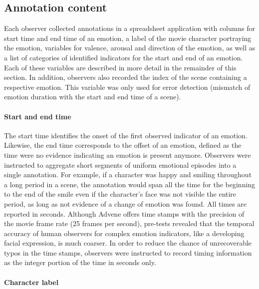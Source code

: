 \subsection*{Annotation content}

Each observer collected annotations in a spreadsheet application with columns
for start time and end time of an emotion, a label of the movie character
portraying the emotion, variables for valence, arousal and direction of the
emotion, as well as a list of categories of identified indicators for the start
and end of an emotion. Each of these variables are described in more detail in
the remainder of this section. In addition, observers also recorded the index
of the scene containing a respective emotion. This variable was only used for
error detection (mismatch of emotion duration with the start and end time of a
scene).

\paragraph{Start and end time}

The start time identifies the onset of the first observed indicator of an
emotion. Likewise, the end time corresponds to the offset of an emotion,
defined as the time were no evidence indicating an emotion is present anymore.
Observers were instructed to aggregate short segments of uniform emotional
episodes into a single annotation. For example, if a character was happy and
smiling throughout a long period in a scene, the annotation would span all the
time for the beginning to the end of the smile even if the character's face was
not visible the entire period, as long as not evidence of a change of emotion
was found.  All times are reported in seconds. Although Advene offers time
stamps with the precision of the movie frame rate (25 frames per second),
pre-tests revealed that the temporal accuracy of human observers for complex
emotion indicators, like a developing facial expression, is much coarser. In
order to reduce the chance of unrecoverable typos in the time stamps, observers
were instructed to record timing information as the integer portion of the time
in seconds only.

\paragraph{Character label}

